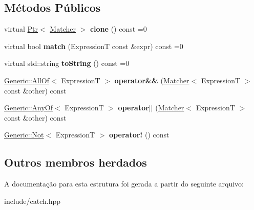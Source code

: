 \subsection*{Métodos Públicos}
\begin{DoxyCompactItemize}
\item 
virtual \hyperlink{classCatch_1_1Ptr}{Ptr}$<$ \hyperlink{structCatch_1_1Matchers_1_1Impl_1_1Matcher}{Matcher} $>$ {\bfseries clone} () const =0\hypertarget{structCatch_1_1Matchers_1_1Impl_1_1Matcher_a9d31e5018fea24efa08c3cbf5aa4475d}{}\label{structCatch_1_1Matchers_1_1Impl_1_1Matcher_a9d31e5018fea24efa08c3cbf5aa4475d}

\item 
virtual bool {\bfseries match} (ExpressionT const \&expr) const =0\hypertarget{structCatch_1_1Matchers_1_1Impl_1_1Matcher_a8c1c5511ce1f3738a45e6901b558f583}{}\label{structCatch_1_1Matchers_1_1Impl_1_1Matcher_a8c1c5511ce1f3738a45e6901b558f583}

\item 
virtual std\+::string {\bfseries to\+String} () const =0\hypertarget{structCatch_1_1Matchers_1_1Impl_1_1Matcher_a091bcc37e589967d7e10fc7790d820e2}{}\label{structCatch_1_1Matchers_1_1Impl_1_1Matcher_a091bcc37e589967d7e10fc7790d820e2}

\item 
\hyperlink{classCatch_1_1Matchers_1_1Impl_1_1Generic_1_1AllOf}{Generic\+::\+All\+Of}$<$ ExpressionT $>$ {\bfseries operator\&\&} (\hyperlink{structCatch_1_1Matchers_1_1Impl_1_1Matcher}{Matcher}$<$ ExpressionT $>$ const \&other) const \hypertarget{structCatch_1_1Matchers_1_1Impl_1_1Matcher_a1d3b73f684611a6a71396caf74427287}{}\label{structCatch_1_1Matchers_1_1Impl_1_1Matcher_a1d3b73f684611a6a71396caf74427287}

\item 
\hyperlink{classCatch_1_1Matchers_1_1Impl_1_1Generic_1_1AnyOf}{Generic\+::\+Any\+Of}$<$ ExpressionT $>$ {\bfseries operator$\vert$$\vert$} (\hyperlink{structCatch_1_1Matchers_1_1Impl_1_1Matcher}{Matcher}$<$ ExpressionT $>$ const \&other) const \hypertarget{structCatch_1_1Matchers_1_1Impl_1_1Matcher_a2e163b264811ba76638469b537467f9e}{}\label{structCatch_1_1Matchers_1_1Impl_1_1Matcher_a2e163b264811ba76638469b537467f9e}

\item 
\hyperlink{classCatch_1_1Matchers_1_1Impl_1_1Generic_1_1Not}{Generic\+::\+Not}$<$ ExpressionT $>$ {\bfseries operator!} () const \hypertarget{structCatch_1_1Matchers_1_1Impl_1_1Matcher_a534857633dde84924993b674cb248c8f}{}\label{structCatch_1_1Matchers_1_1Impl_1_1Matcher_a534857633dde84924993b674cb248c8f}

\end{DoxyCompactItemize}
\subsection*{Outros membros herdados}


A documentação para esta estrutura foi gerada a partir do seguinte arquivo\+:\begin{DoxyCompactItemize}
\item 
include/catch.\+hpp\end{DoxyCompactItemize}
